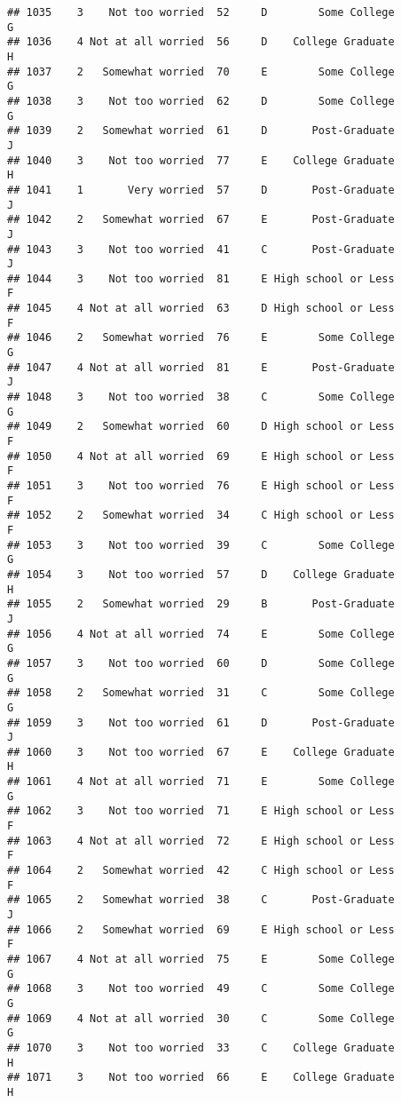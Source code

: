 \documentclass[
]{article}
\begin{document}
\begin{verbatim}
## 1035    3    Not too worried  52     D        Some College         G
## 1036    4 Not at all worried  56     D    College Graduate         H
## 1037    2   Somewhat worried  70     E        Some College         G
## 1038    3    Not too worried  62     D        Some College         G
## 1039    2   Somewhat worried  61     D       Post-Graduate         J
## 1040    3    Not too worried  77     E    College Graduate         H
## 1041    1       Very worried  57     D       Post-Graduate         J
## 1042    2   Somewhat worried  67     E       Post-Graduate         J
## 1043    3    Not too worried  41     C       Post-Graduate         J
## 1044    3    Not too worried  81     E High school or Less         F
## 1045    4 Not at all worried  63     D High school or Less         F
## 1046    2   Somewhat worried  76     E        Some College         G
## 1047    4 Not at all worried  81     E       Post-Graduate         J
## 1048    3    Not too worried  38     C        Some College         G
## 1049    2   Somewhat worried  60     D High school or Less         F
## 1050    4 Not at all worried  69     E High school or Less         F
## 1051    3    Not too worried  76     E High school or Less         F
## 1052    2   Somewhat worried  34     C High school or Less         F
## 1053    3    Not too worried  39     C        Some College         G
## 1054    3    Not too worried  57     D    College Graduate         H
## 1055    2   Somewhat worried  29     B       Post-Graduate         J
## 1056    4 Not at all worried  74     E        Some College         G
## 1057    3    Not too worried  60     D        Some College         G
## 1058    2   Somewhat worried  31     C        Some College         G
## 1059    3    Not too worried  61     D       Post-Graduate         J
## 1060    3    Not too worried  67     E    College Graduate         H
## 1061    4 Not at all worried  71     E        Some College         G
## 1062    3    Not too worried  71     E High school or Less         F
## 1063    4 Not at all worried  72     E High school or Less         F
## 1064    2   Somewhat worried  42     C High school or Less         F
## 1065    2   Somewhat worried  38     C       Post-Graduate         J
## 1066    2   Somewhat worried  69     E High school or Less         F
## 1067    4 Not at all worried  75     E        Some College         G
## 1068    3    Not too worried  49     C        Some College         G
## 1069    4 Not at all worried  30     C        Some College         G
## 1070    3    Not too worried  33     C    College Graduate         H
## 1071    3    Not too worried  66     E    College Graduate         H

\end{verbatim}
\end{document}
